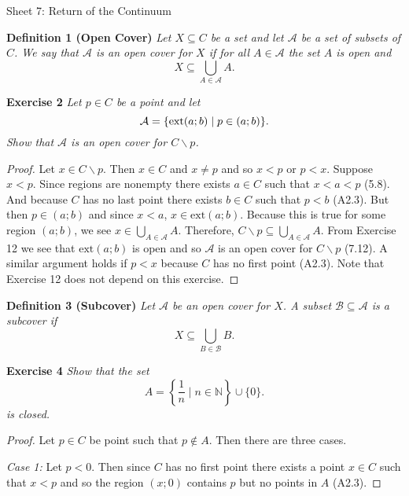 \documentclass{article}
\begin{document}
\begin{flushleft}

\Large

Sheet 7: Return of the Continuum\newline

\normalsize

\textbf{Definition 1 (Open Cover)}
\textsl{Let $X \subseteq C$ be a set and let $\mathcal{A}$ be a set of subsets of $C$. We say that $\mathcal{A}$ is an open cover for $X$ if for all $A \in \mathcal{A}$ the set $A$ is open and
\[
X \subseteq \bigcup_{A \in \mathcal{A}} A.
\]}\newline

\textbf{Exercise 2}
\textsl{Let $p \in C$ be a point and let
\[
\mathcal{A} = \{\textup{ext}(a;b) \mid p \in (a;b)\}.
\]
Show that $\mathcal{A}$ is an open cover for $C \backslash p$.}
\begin{proof}
Let $x \in C \backslash p$. Then $x \in C$ and $x \neq p$ and so $x<p$ or $p<x$. Suppose $x<p$. Since regions are nonempty there exists $a \in C$ such that $x<a<p$ (5.8). And because $C$ has no last point there exists $b \in C$ such that $p<b$ (A2.3). But then $p \in (a;b)$ and since $x < a$, $x \in \text{ext}(a;b)$. Because this is true for some region $(a;b)$, we see $x \in \bigcup_{A \in \mathcal{A}} A$. Therefore, $C \backslash p \subseteq \bigcup_{A \in \mathcal{A}} A$. From Exercise 12 we see that $\text{ext}(a;b)$ is open and so $\mathcal{A}$ is an open cover for $C \backslash p$ (7.12). A similar argument holds if $p < x$ because $C$ has no first point (A2.3). Note that Exercise 12 does not depend on this exercise.
\end{proof}

\textbf{Definition 3 (Subcover)}
\textsl{Let $\mathcal{A}$ be an open cover for $X$. A subset $\mathcal{B} \subseteq \mathcal{A}$ is a subcover if
\[
X \subseteq \bigcup_{B \in \mathcal{B}} B.
\]}\newline

\textbf{Exercise 4}
\textsl{Show that the set
\[
A = \left\{ \frac{1}{n} \mid n \in \mathbb{N} \right\} \cup \{0\}.
\]
is closed.}
\begin{proof}
Let $p \in C$ be point such that $p \notin A$. Then there are three cases.\newline

\textit{Case 1:} Let $p<0$. Then since $C$ has no first point there exists a point $x \in C$ such that $x<p$ and so the region $(x;0)$ contains $p$ but no points in $A$ (A2.3).\newline


\end{proof}
\end{flushleft}
\end{document}
